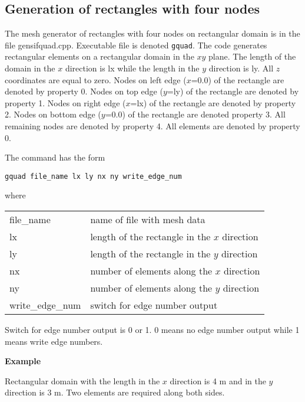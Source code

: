 \documentclass[12pt]{book}
\begin{document}
\subsection{Generation of rectangles with four nodes}

The mesh generator of rectangles with four nodes on rectangular domain is in the file gensifquad.cpp.
Executable file is denoted {\tt gquad}. The code generates rectangular elements on a rectangular domain
in the $xy$ plane. The length of the domain in the $x$ direction is lx while the length in the $y$ direction
is ly. All $z$ coordinates are equal to zero. Nodes on left edge ($x$=0.0) of the rectangle
are denoted by property 0. Nodes on top edge ($y$=ly) of the rectangle are denoted by property 1.
Nodes on right edge ($x$=lx) of the rectangle are denoted by property 2. Nodes on bottom edge ($y$=0.0)
of the rectangle are denoted property 3. All remaining nodes are denoted by property 4.
All elements are denoted by property 0.

\vspace{2mm}
\noindent
The command has the form

{\tt gquad file\_name lx ly nx ny write\_edge\_num}

\vspace{2mm}
\noindent
where

\vspace{2mm}
\noindent
\begin{center}
\begin{tabular}{ll}
file\_name & name of file with mesh data
\\
lx & length of the rectangle in the $x$ direction
\\
ly & length of the rectangle in the $y$ direction
\\
nx & number of elements along the $x$ direction
\\
ny & number of elements along the $y$ direction
\\
write\_edge\_num & switch for edge number output
\\
\end{tabular}
\end{center}

\noindent
Switch for edge number output is 0 or 1. 0 means no edge number output
while 1 means write edge numbers.

\vspace{3mm}
\noindent
{\bf Example}

\noindent
Rectangular domain with the length in the $x$ direction is 4 m and in the
$y$ direction is 3 m. Two elements are required along both sides.
\end{document}
